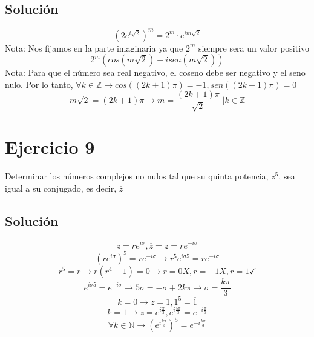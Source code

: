 \documentclass[fleqn]{article}
\begin{document}
	\subsection{Solución}
	\[
	(2e^{i\sqrt{2}})^{m} = 2^{m} \cdot \underline{e^{im\sqrt{2}}}
	\]
	Nota: Nos fijamos en la parte imaginaria ya que $2^{m}$ siempre sera un valor positivo
	\[
	2^{m}(cos(m\sqrt{2}) + isen(m\sqrt{2}))
	\]
	Nota: Para que el número sea real negativo, el coseno debe ser negativo y el seno nulo. Por lo tanto, $\forall k \in \mathbb{Z} \rightarrow cos((2k+1)\pi) = -1, sen((2k+1)\pi) = 0$
	\[
	m\sqrt{2} = (2k+1)\pi \rightarrow \boxed{m = \frac{(2k+1)\pi}{\sqrt{2}} || k \in \mathbb{Z}}
	\]
	\section{Ejercicio 9}
	Determinar los números complejos no nulos tal que su quinta potencia, $z^{5}$, sea igual a su conjugado, es decir, $\overline{z}$
	\subsection{Solución}
	\[
	z = re^{i\sigma}, \overline{z} = z = re^{-i\sigma}
	\]
	\[
	(re^{i\sigma})^{5} = re^{-i\sigma} \rightarrow r^{5}e^{i\sigma5} = re^{-i\sigma}
	\]
	\[
	r^{5} = r \rightarrow r(r^{4} - 1) = 0 \rightarrow r = 0 X, r = -1 X, r = 1 \checkmark
	\]
	\[
	e^{i\sigma5} = e^{-i\sigma} \rightarrow 5\sigma = -\sigma + 2k\pi \rightarrow \sigma = \frac{k\pi}{3}
	\]
	\[
	k = 0 \rightarrow z = 1, \boxed{1^{5} = \overline{1}}
	\]
	\[
	k = 1 \rightarrow z = e^{i\frac{\pi}{3}}, \boxed{e^{i\frac{5\pi}{3}} = e^{-i\frac{\pi}{3}}}
	\]
	\[
	\boxed{\forall k \in \mathbb{N} \rightarrow (e^{i\frac{k\pi}{3}})^{5} = e^{-i\frac{k\pi}{3}}}
	\]
\end{document}
